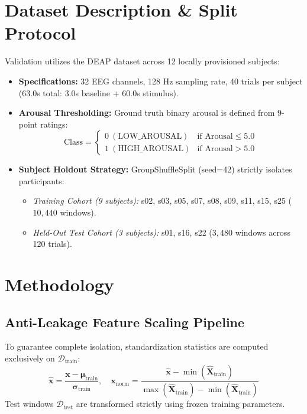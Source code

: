 \documentclass[conference]{IEEEtran}
\begin{document}
\section{Dataset Description \& Split Protocol}
Validation utilizes the DEAP dataset across 12 locally provisioned subjects:
\begin{itemize}
    \item \textbf{Specifications:} 32 EEG channels, 128 Hz sampling rate, 40 trials per subject (63.0s total: 3.0s baseline + 60.0s stimulus).
    \item \textbf{Arousal Thresholding:} Ground truth binary arousal is defined from 9-point ratings:
    \begin{equation}
    \text{Class} = \begin{cases} 0 \ (\text{LOW\_AROUSAL}) & \text{if Arousal} \le 5.0 \\ 1 \ (\text{HIGH\_AROUSAL}) & \text{if Arousal} > 5.0 \end{cases}
    \end{equation}
    \item \textbf{Subject Holdout Strategy:} GroupShuffleSplit (seed=42) strictly isolates participants:
    \begin{itemize}
        \item \textit{Training Cohort (9 subjects):} s02, s03, s05, s07, s08, s09, s11, s15, s25 ($10,440$ windows).
        \item \textit{Held-Out Test Cohort (3 subjects):} s01, s16, s22 ($3,480$ windows across 120 trials).
    \end{itemize}
\end{itemize}

\section{Methodology}

\subsection{Anti-Leakage Feature Scaling Pipeline}
To guarantee complete isolation, standardization statistics are computed exclusively on $\mathcal{D}_{\text{train}}$:
\begin{equation}
\hat{\mathbf{x}} = \frac{\mathbf{x} - \boldsymbol{\mu}_{\text{train}}}{\boldsymbol{\sigma}_{\text{train}}}, \quad \mathbf{x}_{\text{norm}} = \frac{\hat{\mathbf{x}} - \min(\hat{\mathbf{X}}_{\text{train}})}{\max(\hat{\mathbf{X}}_{\text{train}}) - \min(\hat{\mathbf{X}}_{\text{train}})}
\end{equation}
Test windows $\mathcal{D}_{\text{test}}$ are transformed strictly using frozen training parameters.
\end{document}
